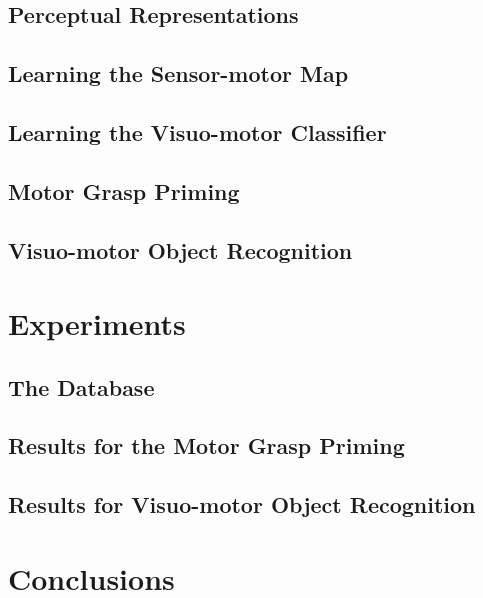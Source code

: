 \documentclass{article}
\begin{document}


\subsection{Perceptual Representations}
\label{sec:2.1}


\subsection{Learning the Sensor-motor Map}
\label{sec:2.2}


\subsection{Learning the Visuo-motor Classifier}
\label{sec:2.3}


\subsection{Motor Grasp Priming}
\label{sec:2.4}


\subsection{Visuo-motor Object Recognition}
\label{sec:2.5}


\section{Experiments}
\label{exper}




\subsection{The Database}
\label{sec:3.1}


\subsection{Results for the Motor Grasp Priming}
\label{sec:3.2}


\subsection{Results for Visuo-motor Object Recognition}
\label{sec:3.3}


\section{Conclusions}






\end{document}

